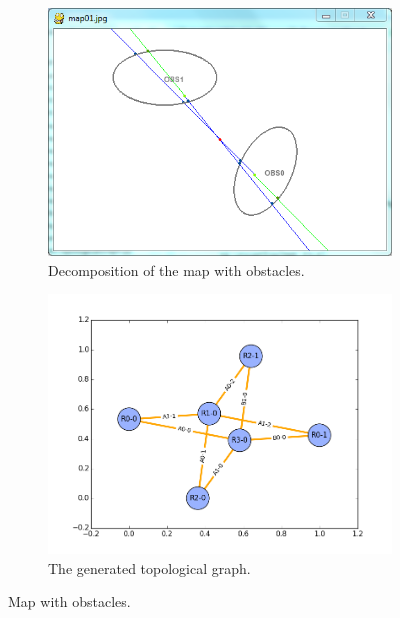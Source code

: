 \documentclass[letterpaper, 10 pt, conference]{ieeeconf}
\begin{document}
\begin{figure}[htbp]
	\centering
	\begin{subfigure}[t]{0.45\linewidth}
		\centering
		\includegraphics[width=\textwidth]{fig/obs_map.png}
		\caption{Decomposition of the map with obstacles.}
		\label{fig:obs_map:map}
	\end{subfigure}  
	\begin{subfigure}[t]{0.5\linewidth}
		\centering
		\includegraphics[width=\textwidth]{fig/obs_topology.png}
		\caption{The generated topological graph.}
		\label{fig:obs_map:topology}
	\end{subfigure}   
	\caption{Map with obstacles.}
	\label{fig:obs_map}
\end{figure}
\end{document}
